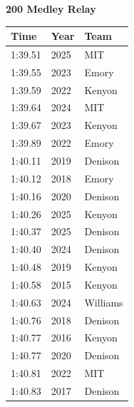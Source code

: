 \noindent\begin{minipage}[t]{0.98\textwidth}
\centering
\textbf{\textcolor{teamprimary}{200 Medley Relay}}\par
\vspace{0.5em}
\centering
\small
\renewcommand{\arraystretch}{1.0}
\setlength{\tabcolsep}{4pt}
\begin{tabular}{@{}p{4.5cm}p{2.5cm}p{4.5cm}@{}}
\toprule
\textbf{Time} & \textbf{Year} & \textbf{Team} \\
\midrule
1:39.51 & 2025 & MIT \\
1:39.55 & 2023 & Emory \\
1:39.59 & 2022 & Kenyon \\
1:39.64 & 2024 & MIT \\
1:39.67 & 2023 & Kenyon \\
1:39.89 & 2022 & Emory \\
1:40.11 & 2019 & Denison \\
1:40.12 & 2018 & Emory \\
1:40.16 & 2020 & Denison \\
1:40.26 & 2025 & Kenyon \\
1:40.37 & 2025 & Denison \\
1:40.40 & 2024 & Denison \\
1:40.48 & 2019 & Kenyon \\
1:40.58 & 2015 & Kenyon \\
1:40.63 & 2024 & Williams \\
1:40.76 & 2018 & Denison \\
1:40.77 & 2016 & Kenyon \\
1:40.77 & 2020 & Denison \\
1:40.81 & 2022 & MIT \\
1:40.83 & 2017 & Denison \\
\bottomrule
\end{tabular}
\end{minipage}
\vspace{1.2em}
